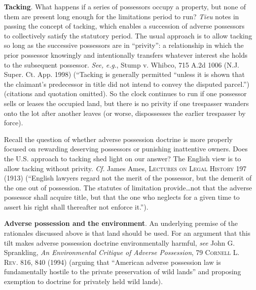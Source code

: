 \item \textbf{Tacking}. What happens if a series of possessors occupy a
property, but none of them are present long enough for the limitations period
to run? \textit{Tieu} notes in passing the concept of tacking, which enables a
succession of adverse possessors to collectively satisfy the statutory period.
The usual approach is to allow tacking so long as the successive possessors are
in ``privity'': a relationship in which the prior possessor knowingly and
intentionally transfers whatever interest she holds to the subsequent
possessor. \textit{See, e.g.}, Stump v. Whibco, 715 A.2d 1006 (N.J. Super. Ct.
App. 1998) (``Tacking is generally permitted ``unless it is shown that the
claimant's predecessor in title did not intend to convey the disputed
parcel.'') (citations and quotation omitted). So the clock continues to run if
one possessor sells or leases the occupied land, but there is no privity if one
trespasser wanders onto the lot after another leaves (or worse, dispossesses
the earlier trespasser by force). 

Recall the question of whether adverse possession doctrine is more properly
focused on rewarding deserving possessors or punishing inattentive owners. Does
the U.S. approach to tacking shed light on our answer? The English view is to
allow tacking without privity. \textit{Cf.} James Ames, \textsc{Lectures on
Legal History} 197 (1913) (``English lawyers regard not the merit of the
possessor, but the demerit of the one out of possession. The statutes of
limitation provide\ldots not that the adverse possessor shall acquire title,
but that the one who neglects for a given time to assert his right shall
thereafter not enforce it.'').

\item \textbf{Adverse possession and the environment}. An underlying
premise of the rationales discussed above is that land should be used. For an
argument that this tilt makes adverse possession doctrine environmentally
harmful, \textit{see} John G. Sprankling, \textit{An Environmental Critique of
Adverse Possession}, 79 \textsc{Cornell L. Rev}. 816, 840 (1994) (arguing that
``American adverse possession law is fundamentally hostile to the private
preservation of wild lands'' and proposing exemption to doctrine for privately
held wild lands).

